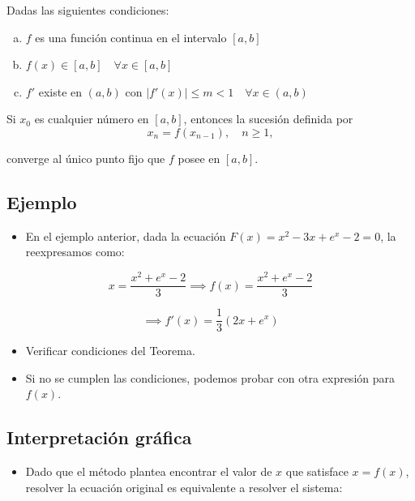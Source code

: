 \documentclass[openany]{book}
\providecommand{\tightlist}{%
  \setlength{\itemsep}{0pt}\setlength{\parskip}{0pt}}
\begin{document}
Dadas las siguientes condiciones:

\begin{enumerate}[(a)]
\item $f$ es una función continua en el intervalo $[a, b]$
\item $f(x) \in [a, b] \quad \forall x \in [a, b]$
\item $f'$ existe en $(a, b)$ con $|f'(x)| \le m < 1 \quad \forall x \in (a, b)$
\end{enumerate}

Si \(x_0\) es cualquier número en \([a, b]\), entonces la sucesión definida por
\[ x_n = f(x_{n-1}), \quad n \ge 1,\]

converge al único punto fijo que \(f\) posee en \([a, b]\).

\hypertarget{ejemplo-4}{%
\subsection{Ejemplo}\label{ejemplo-4}}

\begin{itemize}
\tightlist
\item
  En el ejemplo anterior, dada la ecuación \(F(x) = x^2-3x+e^x-2=0\), la reexpresamos como:
\end{itemize}

\[x = \frac{x^2+e^x-2}{3} \implies f(x)= \frac{x^2+e^x-2}{3}\]

\[\implies f'(x) = \frac{1}{3}(2x+e^x)\]

\begin{itemize}
\tightlist
\item
  Verificar condiciones del Teorema.
\item
  Si no se cumplen las condiciones, podemos probar con otra expresión para \(f(x)\).
\end{itemize}

\hypertarget{interpretaciuxf3n-gruxe1fica}{%
\subsection{Interpretación gráfica}\label{interpretaciuxf3n-gruxe1fica}}

\begin{itemize}
\tightlist
\item
  Dado que el método plantea encontrar el valor de \(x\) que satisface \(x = f(x)\), resolver la ecuación original es equivalente a resolver el sistema:
\end{itemize}
\end{document}
